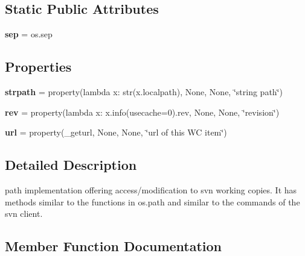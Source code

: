 \subsection*{Static Public Attributes}
\begin{DoxyCompactItemize}
\item 
\mbox{\label{classpy_1_1__path_1_1svnwc_1_1_svn_w_c_command_path_a1758d799c3ce4a389ce81b7fe8290ce1}} 
{\bfseries sep} = os.\+sep
\end{DoxyCompactItemize}
\subsection*{Properties}
\begin{DoxyCompactItemize}
\item 
\mbox{\label{classpy_1_1__path_1_1svnwc_1_1_svn_w_c_command_path_acb26852e2b1a8b52d198d1af47a04ae2}} 
{\bfseries strpath} = property(lambda x\+: str(x.\+localpath), None, None, \char`\"{}string path\char`\"{})
\item 
\mbox{\label{classpy_1_1__path_1_1svnwc_1_1_svn_w_c_command_path_a3d174ce434743687a4af6750135662a6}} 
{\bfseries rev} = property(lambda x\+: x.\+info(usecache=0).rev, None, None, \char`\"{}revision\char`\"{})
\item 
\mbox{\label{classpy_1_1__path_1_1svnwc_1_1_svn_w_c_command_path_a104b98336267f0333f49406213181bcb}} 
{\bfseries url} = property(\+\_\+geturl, None, None, \char`\"{}url of this WC item\char`\"{})
\end{DoxyCompactItemize}


\subsection{Detailed Description}
\begin{DoxyVerb}path implementation offering access/modification to svn working copies.
    It has methods similar to the functions in os.path and similar to the
    commands of the svn client.
\end{DoxyVerb}
 

\subsection{Member Function Documentation}
\mbox{\label{classpy_1_1__path_1_1svnwc_1_1_svn_w_c_command_path_a943b2eafd3d9f521f8965dc5b066b8d9}} 
